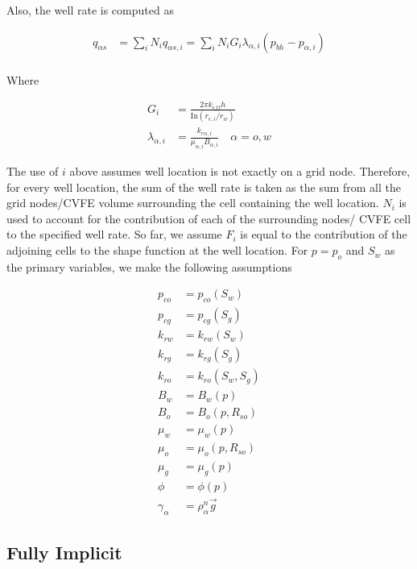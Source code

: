 \documentclass[12pt]{article}
\begin{document}
Also, the well rate is computed as

\begin{equation}
\begin{split}
q_{\alpha s} &=\sum_i N_i q_{\alpha s,i}= \sum_i N_iG_i\lambda_{\alpha,i}(p_{bh}-p_{\alpha,i})	\\
\end{split}
\end{equation}

Where

\begin{equation}
\begin{split}
G_i &=\frac{2\pi k_{eff}  h}{\text{In}(r_{e,i}/r_w)}	\\
\lambda_{\alpha,i} &= \frac{k_{r\alpha,i}}{\mu_{\alpha,i} B_{\alpha,i}} \quad \alpha = o, w
\end{split}
\end{equation}

The use of $i$ above assumes well location is not exactly on a grid node. Therefore, for every well location, the sum of the well rate is taken as the sum from all the grid nodes/CVFE volume surrounding the cell containing the well location. $N_i$ is used to account for the contribution of each of the surrounding nodes/ CVFE cell to the specified well rate. So far, we assume $F_i$ is equal to the contribution of the adjoining cells to the shape function at the well location. 
For $p = p_o$ and $S_w$ as the primary variables, we make the following assumptions

\begin{equation}
\begin{split}
p_{co}  &= p_{co}(S_w) 	\\
p_{cg}  &= p_{cg}(S_g) 	\\
k_{rw} &= k_{rw}(S_w)	\\
k_{rg} &= k_{rg}(S_g)	\\
k_{ro} &= k_{ro}(S_w, S_g)	\\
B_w &= B_w(p) 	\\
B_o &= B_o(p, R_{so}) 	\\
\mu_w &= \mu_w(p) 	\\
\mu_o &= \mu_o(p, R_{so}) 	\\
\mu_g &= \mu_g(p) 	\\
\phi &= \phi(p)	\\
\gamma_\alpha &= \rho_\alpha^n\vec{g}
\end{split}
\end{equation}

\subsection{Fully Implicit}
\end{document}
